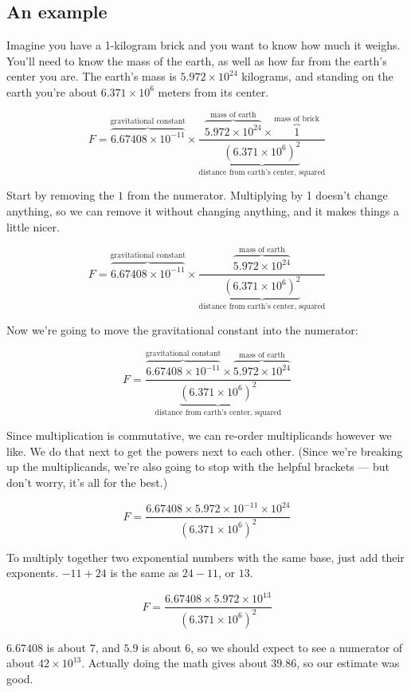 \documentclass[10pt,twocolumn,letterpaper,preprint]{article}
\begin{document}
\subsection{An example}
Imagine you have a 1-kilogram brick and you want to know how much it weighs.
You'll need to know the mass of the earth, as well as how far from the earth's
center you are.  The earth's mass is $5.972 \times 10^{24}$ kilograms, and
standing on the earth you're about $6.371 \times 10^6$ meters from its center.

\[
F = \overbrace{6.67408 \times 10^{-11}}^\text{gravitational constant}
\times \frac{\overbrace{5.972 \times 10^{24}}^\text{mass of earth} \times
\overbrace{1}^\text{mass of brick}}{\underbrace{(6.371 \times 10^6)^2}_{\text{
distance from earth's center, squared}}}
\]

Start by removing the $1$ from the numerator.  Multiplying by 1 doesn't change
anything, so we can remove it without changing anything, and it makes things
a little nicer.

\[
F = \overbrace{6.67408 \times 10^{-11}}^\text{gravitational constant}
\times \frac{\overbrace{5.972 \times 10^{24}}^\text{mass of earth}}
{\underbrace{(6.371 \times 10^6)^2}_{\text{
distance from earth's center, squared}}}
\]

Now we're going to move the gravitational constant into the numerator:

\[
F = \frac{\overbrace{6.67408 \times 10^{-11}}^\text{gravitational constant}
\times \overbrace{5.972 \times 10^{24}}^\text{mass of earth}}
{\underbrace{(6.371 \times 10^6)^2}_{\text{
distance from earth's center, squared}}}
\]

Since multiplication is commutative, we can re-order multiplicands however
we like.  We do that next to get the powers next to each other.  (Since we're
breaking up the multiplicands, we're also going to stop with the helpful
brackets --- but don't worry, it's all for the best.)

\[
F = \frac{6.67408 \times 5.972 \times 10^{-11} \times 10^{24}}{(6.371 \times
10^6)^2}
\]

To multiply together two exponential numbers with the same base, just add
their exponents.  $-11 + 24$ is the same as $24 - 11$, or $13$.

\[
F = \frac{6.67408 \times 5.972 \times 10^{13}}{(6.371 \times 10^6)^2}
\]

$6.67408$ is about $7$, and $5.9$ is about $6$, so we should expect to see
a numerator of about $42 \times 10^{13}$.  Actually doing the math gives about
$39.86$, so our estimate was good.
\end{document}
